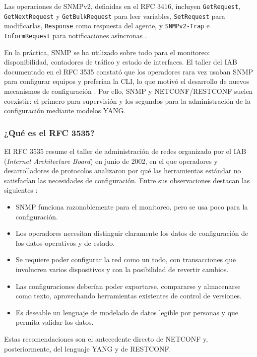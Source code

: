 Las operaciones de SNMPv2, definidas en el RFC 3416, incluyen \texttt{GetRequest}, \texttt{GetNextRequest} y \texttt{GetBulkRequest} para leer variables, \texttt{SetRequest} para modificarlas, \texttt{Response} como respuesta del agente, y \texttt{SNMPv2-Trap} e \texttt{InformRequest} para notificaciones asíncronas \parencite{rfc3416}.

En la práctica, SNMP se ha utilizado sobre todo para el monitoreo: disponibilidad, contadores de tráfico y estado de interfaces. El taller del IAB documentado en el RFC 3535 constató que los operadores rara vez usaban SNMP para configurar equipos y preferían la CLI, lo que motivó el desarrollo de nuevos mecanismos de configuración \parencite{rfc3535}. Por ello, SNMP y NETCONF/RESTCONF suelen coexistir: el primero para supervisión y los segundos para la administración de la configuración mediante modelos YANG.

\subsubsection{¿Qué es el RFC 3535?}
El RFC 3535 resume el taller de administración de redes organizado por el IAB (\textit{Internet Architecture Board}) en junio de 2002, en el que operadores y desarrolladores de protocolos analizaron por qué las herramientas estándar no satisfacían las necesidades de configuración. Entre sus observaciones destacan las siguientes \parencite{rfc3535}:
\begin{itemize}
  \item SNMP funciona razonablemente para el monitoreo, pero se usa poco para la configuración.
  \item Los operadores necesitan distinguir claramente los datos de configuración de los datos operativos y de estado.
  \item Se requiere poder configurar la red como un todo, con transacciones que involucren varios dispositivos y con la posibilidad de revertir cambios.
  \item Las configuraciones deberían poder exportarse, compararse y almacenarse como texto, aprovechando herramientas existentes de control de versiones.
  \item Es deseable un lenguaje de modelado de datos legible por personas y que permita validar los datos.
\end{itemize}
Estas recomendaciones son el antecedente directo de NETCONF y, posteriormente, del lenguaje YANG y de RESTCONF.


